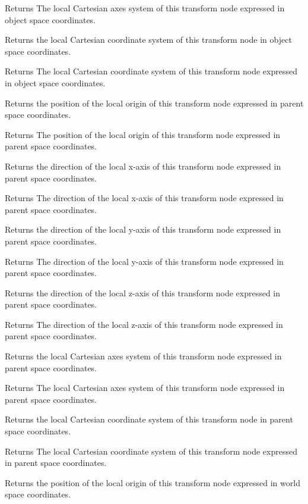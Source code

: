 \begin{DoxyReturn}{Returns}
The local Cartesian axes system of this transform node expressed in object space coordinates.
\end{DoxyReturn}
Returns the local Cartesian coordinate system of this transform node in object space coordinates.

\begin{DoxyReturn}{Returns}
The local Cartesian coordinate system of this transform node expressed in object space coordinates.
\end{DoxyReturn}
Returns the position of the local origin of this transform node expressed in parent space coordinates.

\begin{DoxyReturn}{Returns}
The position of the local origin of this transform node expressed in parent space coordinates.
\end{DoxyReturn}
Returns the direction of the local x-\/axis of this transform node expressed in parent space coordinates.

\begin{DoxyReturn}{Returns}
The direction of the local x-\/axis of this transform node expressed in parent space coordinates.
\end{DoxyReturn}
Returns the direction of the local y-\/axis of this transform node expressed in parent space coordinates.

\begin{DoxyReturn}{Returns}
The direction of the local y-\/axis of this transform node expressed in parent space coordinates.
\end{DoxyReturn}
Returns the direction of the local z-\/axis of this transform node expressed in parent space coordinates.

\begin{DoxyReturn}{Returns}
The direction of the local z-\/axis of this transform node expressed in parent space coordinates.
\end{DoxyReturn}
Returns the local Cartesian axes system of this transform node expressed in parent space coordinates.

\begin{DoxyReturn}{Returns}
The local Cartesian axes system of this transform node expressed in parent space coordinates.
\end{DoxyReturn}
Returns the local Cartesian coordinate system of this transform node in parent space coordinates.

\begin{DoxyReturn}{Returns}
The local Cartesian coordinate system of this transform node expressed in parent space coordinates.
\end{DoxyReturn}
Returns the position of the local origin of this transform node expressed in world space coordinates.

